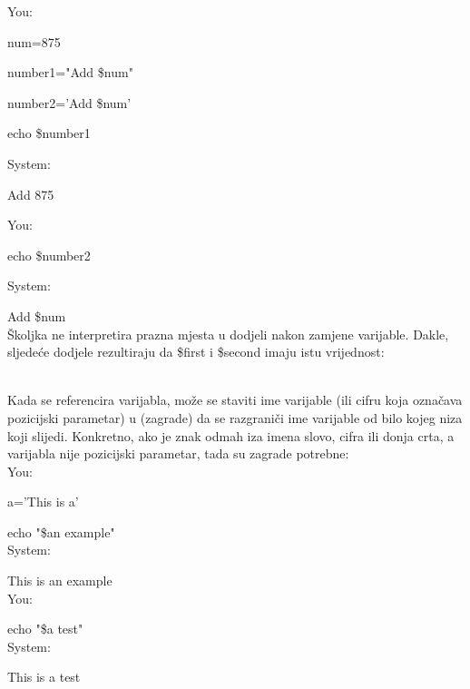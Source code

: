 \documentclass[11pt]{book}
\begin{document}
You:            	\par{num=875}

               		number1="Add \$num"
               		
               		number2='Add \$num'
               		
               	 	echo \$number1
               	 	
System:         	\par{Add 875}

You:           	\par{echo \$number2}

System:         	\par{Add \$num}\\

Školjka ne interpretira prazna mjesta u dodjeli nakon zamjene varijable. Dakle, sljedeće dodjele rezultiraju da \$first i \$second imaju istu vrijednost:\\

\\

Kada se referencira varijabla, može se staviti ime varijable (ili cifru koja označava pozicijski parametar) u { } (zagrade) da se razgraniči ime varijable od bilo kojeg niza 	koji slijedi. Konkretno, ako je znak odmah iza imena slovo, cifra ili donja crta, a varijabla nije pozicijski parametar, tada su zagrade potrebne:\\

You:\\           	\par{a='This is a'}

                		echo "\${a}n example"\\
                		
System:\\         	\par{This is an example}\\

You:\\            	\par{echo "\$a test"}\\

System:\\        	\par{This is a test}
\end{document}
